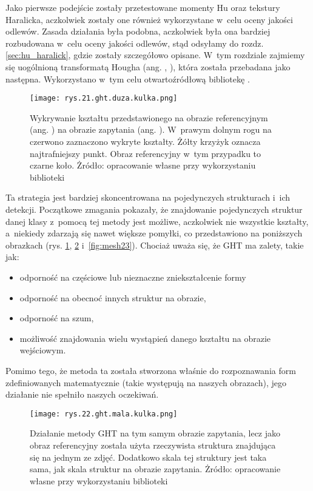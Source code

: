 Jako pierwsze podejście zostały przetestowane momenty Hu oraz tekstury Haralicka, aczkolwiek zostały one również wykorzystane w~celu oceny jakości odlewów. Zasada działania była podobna, aczkolwiek była ona bardziej rozbudowana w~celu oceny jakości odlewów, stąd odsyłamy do rozdz. \ref{sec:hu_haralick}, gdzie zostały szczegółowo opisane. W~tym rozdziale zajmiemy się uogólnioną transformatą Hougha (ang. , ), która została przebadana jako następna. Wykorzystano w~tym celu otwartoźródłową bibliotekę . 
\begin{figure}[h]
    \centering
    \texttt{[image: rys.21.ght.duza.kulka.png]}
    \caption{Wykrywanie kształtu przedstawionego na obrazie referencyjnym (ang. ) na obrazie zapytania (ang. ). W~prawym dolnym rogu na czerwono zaznaczono wykryte kształty. Żółty krzyżyk oznacza najtrafniejszy punkt. Obraz referencyjny w~tym przypadku to czarne koło. Żródło: opracowanie własne przy wykorzystaniu biblioteki }
    \label{fig:mesh21}
\end{figure}
Ta strategia jest bardziej skoncentrowana na pojedynczych strukturach i~ich detekcji. Początkowe zmagania pokazały, że znajdowanie pojedynczych struktur danej klasy z~pomocą tej metody jest możliwe, aczkolwiek nie wszystkie kształty, a~niekiedy zdarzają się nawet większe pomyłki, co przedstawiono na poniższych obrazkach (rys. \ref{fig:mesh21}, \ref{fig:mesh22} i~\ref{fig:mesh23}). Chociaż uważa się, że GHT ma zalety, takie jak:
\begin{itemize}
	\item odporność na częściowe lub nieznaczne zniekształcenie formy
	\item odporność na obecnoć innych struktur na obrazie,
	\item odporność na szum,
	\item możliwość znajdowania wielu wystąpień danego kształtu na obrazie wejściowym.
\end{itemize}
Pomimo tego, że metoda ta została stworzona właśnie do rozpoznawania form zdefiniowanych matematycznie (takie występują na naszych obrazach), jego działanie nie spełniło naszych oczekiwań.
\begin{figure}[h]
    \centering
    \texttt{[image: rys.22.ght.mala.kulka.png]}
    \caption{Działanie metody GHT na tym samym obrazie zapytania, lecz jako obraz referencyjny została użyta rzeczywista struktura znajdująca się na jednym ze zdjęć. Dodatkowo skala tej struktury jest taka sama, jak skala struktur na obrazie zapytania. Żródło: opracowanie własne przy wykorzystaniu biblioteki }
    \label{fig:mesh22}
\end{figure}
